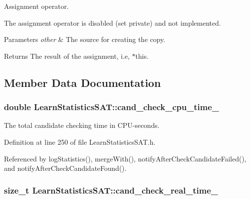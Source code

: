 Assignment operator. 

The assignment operator is disabled (set private) and not implemented.


\begin{DoxyParams}{Parameters}
{\em other} & The source for creating the copy. \\
\hline
\end{DoxyParams}
\begin{DoxyReturn}{Returns}
The result of the assignment, i.\-e, $\ast$this. 
\end{DoxyReturn}


\subsection{Member Data Documentation}
\hypertarget{classLearnStatisticsSAT_a2ab5cd522b7a4d700a11c0bb430baa81}{
\subsubsection[{cand\-\_\-check\-\_\-cpu\-\_\-time\-\_\-}]{\setlength{\rightskip}{0pt plus 5cm}double Learn\-Statistics\-S\-A\-T\-::cand\-\_\-check\-\_\-cpu\-\_\-time\-\_\-\hspace{0.3cm}{\ttfamily [protected]}}}\label{classLearnStatisticsSAT_a2ab5cd522b7a4d700a11c0bb430baa81}


The total candidate checking time in C\-P\-U-\/seconds. 



Definition at line 250 of file Learn\-Statistics\-S\-A\-T.\-h.



Referenced by log\-Statistics(), merge\-With(), notify\-After\-Check\-Candidate\-Failed(), and notify\-After\-Check\-Candidate\-Found().

\hypertarget{classLearnStatisticsSAT_a2e0611b0c6f80cbc7b36f25ce5e89db9}{
\subsubsection[{cand\-\_\-check\-\_\-real\-\_\-time\-\_\-}]{\setlength{\rightskip}{0pt plus 5cm}size\-\_\-t Learn\-Statistics\-S\-A\-T\-::cand\-\_\-check\-\_\-real\-\_\-time\-\_\-\hspace{0.3cm}{\ttfamily [protected]}}}\label{classLearnStatisticsSAT_a2e0611b0c6f80cbc7b36f25ce5e89db9}


